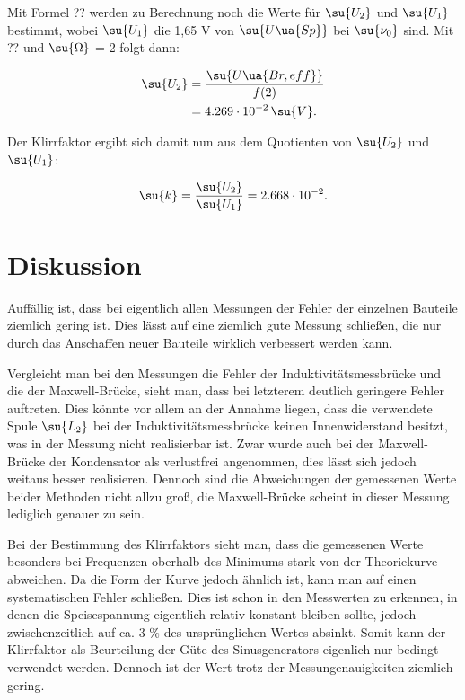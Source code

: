 Mit Formel ?? werden zu Berechnung noch die Werte für $\su{U_2}$ und $\su{U_1}$ bestimmt,
wobei $\su{U_1}$ die 1,65 V von $\su{U\ua{Sp}}$ bei $\su{\nu_0}$ sind. Mit ?? und
 $\su{\Omega}$ = 2 folgt dann:

\begin{align}
  \su{U_2} &= \frac{\su{U\ua{Br,eff}}}{f(2)} \\
           &= 4.269 \cdot 10^{-2} \, \su{V}.
\end{align}

Der Klirrfaktor ergibt sich damit nun aus dem Quotienten von $\su{U_2}$ und
$\su{U_1}$:

\begin{equation}
  \su{k} = \frac{\su{U_2}}{\su{U_1}} = 2.668 \cdot 10^{-2}.
\end{equation}

\newpage


\section{Diskussion}

Auffällig ist, dass bei eigentlich allen Messungen der Fehler der einzelnen
Bauteile ziemlich gering ist. Dies lässt auf eine ziemlich gute Messung schließen,
die nur durch das Anschaffen neuer Bauteile wirklich verbessert werden kann.

Vergleicht man bei den Messungen die Fehler der Induktivitätsmessbrücke und die
der Maxwell-Brücke, sieht man, dass bei letzterem deutlich geringere Fehler
auftreten. Dies könnte vor allem an der Annahme liegen, dass die verwendete
Spule $\su{L_2}$ bei der Induktivitätsmessbrücke keinen Innenwiderstand besitzt,
was in der Messung nicht realisierbar ist.
Zwar wurde auch bei der Maxwell-Brücke der Kondensator als verlustfrei angenommen,
dies lässt sich jedoch weitaus besser realisieren. Dennoch sind die Abweichungen
der gemessenen Werte beider Methoden nicht allzu groß, die Maxwell-Brücke
scheint in dieser Messung lediglich genauer zu sein.

Bei der Bestimmung des Klirrfaktors sieht man, dass die gemessenen Werte besonders
bei Frequenzen oberhalb des Minimums stark von der Theoriekurve abweichen. Da die
Form der Kurve jedoch ähnlich ist, kann man auf einen systematischen Fehler schließen.
Dies ist schon in den Messwerten zu erkennen, in denen die Speisespannung eigentlich
relativ konstant bleiben sollte, jedoch zwischenzeitlich auf ca. 3 $\%$ des
ursprünglichen Wertes absinkt. Somit kann der Klirrfaktor als Beurteilung der
Güte des Sinusgenerators eigenlich nur bedingt verwendet werden. Dennoch ist
der Wert trotz der Messungenauigkeiten ziemlich gering.




